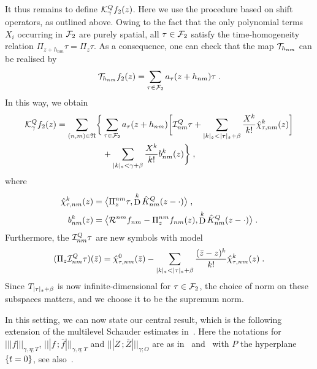\documentclass[reqno,11pt]{article}
\def\normDgamma#1{|\!|\!|#1|\!|\!|}
\def\seminormff#1#2{|\!|\!|#1\,\mathord{;}\,#2|\!|\!|}
\def\KQhat{\hat K^Q}
\def\abss#1{\abs{#1}_\mathfrak{s}}
\DeclareMathOperator{\D}{D}            %
\newcommand{\setnm}{\mathfrak{N}}
\newcommand{\sumnm}{\sum_{(n,m)\in\setnm}}
\begin{document}
It thus remains to define ${\mathcal K}^Q_\gamma f_2(z)$. Here we use the procedure
based on shift operators, as outlined above. Owing to the fact that 
the only polynomial terms $X_i$ occurring in ${\mathcal F}_2$ are purely 
spatial, all $\tau\in{\mathcal F}_2$ satisfy the time-homogeneity relation 
$\Pi_{z+h_{nm}}\tau = \Pi_z\tau$. As a consequence, one can check that the map 
${\mathcal T}_{h_{nm}}$ can be realised by 
\begin{equation}
 {\mathcal T}_{h_{nm}} f_2(z) = 
\sum_{\tau\in{\mathcal F}_2} a_\tau(z+h_{nm})\tau\;.
\end{equation} 
In this way, we obtain 
\begin{align}
\nonumber
 \cK^Q_\gamma f_2(z) = \sumnm \biggl\{ &\sum_{\tau\in\cF_2} 
 a_\tau(z+h_{nm}) \biggbrak{\cI^Q_{nm}\tau 
 + \sum_{\abss{k} < \abss{\tau}+\beta} \frac{X^k}{k!} 
 \hat\chi^k_{\tau,nm}(z)} \\
 &{}+ \sum_{\abss{k} < \gamma+\beta} \frac{X^k}{k!} 
 b^k_{nm}(z) \biggr\}\;, 
 \label{eq:def_KQf2} 
\end{align}
where
\begin{align}
\nonumber
\hat\chi^k_{\tau,nm}(z) &=
\bigpscal{\Pi_z^{nm}\tau}{\D^k\KQhat_{nm}(z-\cdot)}\;,
\\
b^k_{nm}(z) &= \bigpscal{\cR^{nm}f_{nm} - \Pi^{nm}_z
f_{nm}(z)}{\D^k\KQhat_{nm}(z-\cdot)}\;.
 \label{eq:def_bknm} 
\end{align}
Furthermore, the ${\mathcal I}^Q_{nm}\tau$ are new symbols with model 
\begin{equation}
\label{eq:model_IQnm} 
 (\Pi_z\cI^Q_{nm}\tau)(\bar z) 
 = \hat\chi^0_{\tau,nm}(\bar z) 
 - \sum_{\abss{k} < \abss{\tau}+\beta} \frac{(\bar z-z)^k}{k!}
\hat\chi^k_{\tau,nm}(z)\;.
\end{equation} 
Since $T_{\abss{\tau}+\beta}$ is now infinite-dimensional for $\tau\in{\mathcal F}_2$, 
the choice of norm on these subspaces matters, and we choose it to be the 
supremum norm. 

In this setting, we can now state our central result, which is the following
extension of the multilevel Schauder estimates in~\cite[Thm.~5.12]{Hairer2014}.
Here the notations for $\normDgamma{f}_{\gamma,\eta;T}$, $\seminormff{f}{\bar
f}_{\gamma,\eta;T}$ and $\seminormff{Z}{\bar Z}_{\gamma;O}$ are as
in~\cite[Def.~6.2]{Hairer2014} and~\cite[Sec.~7.1]{Hairer2014} with $P$ the
hyperplane $\{t=0\}$, see also~\cite[Sec.~4.3]{BK2016}. 
\end{document}
